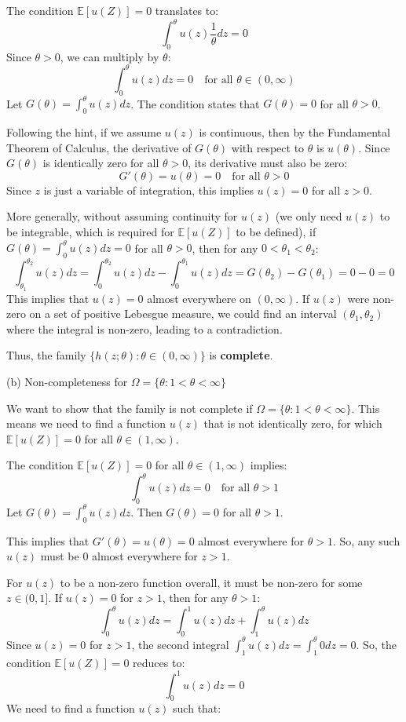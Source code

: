 The condition $\mathbb{E}[u(Z)] = 0$ translates to:
\[
\int_0^\theta u(z) \frac{1}{\theta} dz = 0
\]
Since $\theta > 0$, we can multiply by $\theta$:
\[
\int_0^\theta u(z) dz = 0 \quad \text{for all } \theta \in (0, \infty)
\]
Let $G(\theta) = \int_0^\theta u(z) dz$. The condition states that $G(\theta) = 0$ for all $\theta > 0$.

Following the hint, if we assume $u(z)$ is continuous, then by the Fundamental Theorem of Calculus, the derivative of $G(\theta)$ with respect to $\theta$ is $u(\theta)$. Since $G(\theta)$ is identically zero for all $\theta > 0$, its derivative must also be zero:
\[
G'(\theta) = u(\theta) = 0 \quad \text{for all } \theta > 0
\]
Since $z$ is just a variable of integration, this implies $u(z) = 0$ for all $z > 0$.

More generally, without assuming continuity for $u(z)$ (we only need $u(z)$ to be integrable, which is required for $\mathbb{E}[u(Z)]$ to be defined), if $G(\theta) = \int_0^\theta u(z) dz = 0$ for all $\theta > 0$, then for any $0 < \theta_1 < \theta_2$:
\[
\int_{\theta_1}^{\theta_2} u(z) dz = \int_0^{\theta_2} u(z) dz - \int_0^{\theta_1} u(z) dz = G(\theta_2) - G(\theta_1) = 0 - 0 = 0
\]
This implies that $u(z) = 0$ almost everywhere on $(0, \infty)$. If $u(z)$ were non-zero on a set of positive Lebesgue measure, we could find an interval $(\theta_1, \theta_2)$ where the integral is non-zero, leading to a contradiction.

Thus, the family $\{h(z;\theta):\theta\in(0,\infty)\}$ is \textbf{complete}.

(b) Non-completeness for $\Omega = \{\theta : 1 < \theta < \infty\}$

We want to show that the family is not complete if $\Omega = \{\theta : 1 < \theta < \infty\}$. This means we need to find a function $u(z)$ that is not identically zero, for which $\mathbb{E}[u(Z)] = 0$ for all $\theta \in (1, \infty)$.

The condition $\mathbb{E}[u(Z)] = 0$ for all $\theta \in (1, \infty)$ implies:
\[
\int_0^\theta u(z) dz = 0 \quad \text{for all } \theta > 1
\]
Let $G(\theta) = \int_0^\theta u(z) dz$. Then $G(\theta) = 0$ for all $\theta > 1$.

This implies that $G'(\theta) = u(\theta) = 0$ almost everywhere for $\theta > 1$. So, any such $u(z)$ must be $0$ almost everywhere for $z > 1$.

For $u(z)$ to be a non-zero function overall, it must be non-zero for some $z \in (0, 1]$.
If $u(z) = 0$ for $z > 1$, then for any $\theta > 1$:
\[
\int_0^\theta u(z) dz = \int_0^1 u(z) dz + \int_1^\theta u(z) dz
\]
Since $u(z) = 0$ for $z > 1$, the second integral $\int_1^\theta u(z) dz = \int_1^\theta 0 dz = 0$.
So, the condition $\mathbb{E}[u(Z)]=0$ reduces to:
\[
\int_0^1 u(z) dz = 0
\]
We need to find a function $u(z)$ such that:

